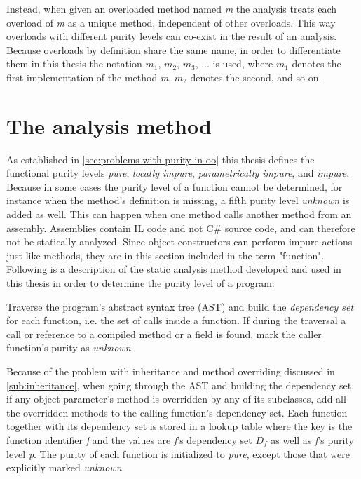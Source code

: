 \documentclass[a4paper,12pt]{article}
\begin{document}
Instead, when given an overloaded method named \textit{m} the analysis treats each overload of \textit{m} as a unique method, independent of other overloads. This way overloads with different purity levels can co-exist in the result of an analysis. Because overloads by definition share the same name, in order to differentiate them in this thesis the notation $m_1$, $m_2$, $m_3$, ... is used, where $m_1$ denotes the first implementation of the method \textit{m}, $m_2$ denotes the second, and so on.

\section{The analysis method} \label{sec:the-analysis-method}

As established in \autoref{sec:problems-with-purity-in-oo} this thesis defines the functional purity levels \textit{pure}, \textit{locally impure}, \textit{parametrically impure}, and \textit{impure}. Because in some cases the purity level of a function cannot be determined, for instance when the method's definition is missing, a fifth purity level \textit{unknown} is added as well. This can happen when one method calls another method from an assembly. Assemblies contain IL code and not C\# source code, and can therefore not be statically analyzed. Since object constructors can perform impure actions just like methods, they are in this section included in the term "function". Following is a description of the static analysis method developed and used in this thesis in order to determine the purity level of a program:

Traverse the program's abstract syntax tree (AST) and build the \textit{dependency set} for each function, i.e. the set of calls inside a function. If during the traversal a call or reference to a compiled method or a field is found, mark the caller function's purity as \textit{unknown}.

Because of the problem with inheritance and method overriding discussed in \autoref{sub:inheritance}, when going through the AST and building the dependency set, if any object parameter's method is overridden by any of its subclasses, add all the overridden methods to the calling function's dependency set. Each function together with its dependency set is stored in a lookup table where the key is the function identifier \textit{f} and the values are \textit{f}'s dependency set $D_f$ as well as \textit{f}'s purity level \textit{p}. The purity of each function is initialized to \textit{pure}, except those that were explicitly marked \textit{unknown}.
\end{document}
